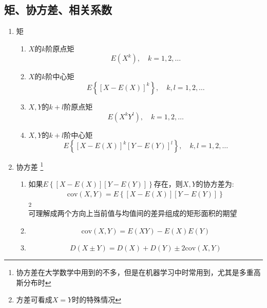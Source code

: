 \subsection{矩、协方差、相关系数}
\begin{enumerate}
	\item 矩
	\begin{enumerate}
		\item $X$的$k$阶原点矩
		\begin{equation}
			E(X^k), \quad k = 1, 2, \dots
		\end{equation}

		\item $X$的$k$阶中心矩
		\begin{equation}
			E\left\{\left[X-E(X) \right]^k\right\}, \quad k,l = 1, 2, \dots
		\end{equation}

		\item $X,Y$的$k+l$阶原点矩
		\begin{equation}
			E(X^kY^l), \quad k = 1, 2, \dots
		\end{equation}

		\item $X,Y$的$k+l$阶中心矩
		\begin{equation}
			E\left\{\left[X-E(X) \right]^k \left[Y-E(Y) \right]^l\right\}, \quad k,l = 1, 2, \dots
		\end{equation}
	\end{enumerate}
	
	\item 协方差 
	\footnote{协方差在大学数学中用到的不多，但是在机器学习中时常用到，尤其是多重高斯分布时} \\
	\begin{enumerate}
		\item 如果$E\left\{\left[X-E(X)\right]\left[Y-E(Y)\right]\right\}$存在，则$X,Y$的协方差为:
		\begin{align}
			\mathrm{cov}(X,Y) = E\left\{\left[X-E(X)\right]\left[Y-E(Y)\right]\right\}
		\end{align}
		\footnote{方差可看成$X=Y$时的特殊情况} \\
		可理解成两个方向上当前值与均值间的差异组成的矩形面积的期望
		\item 
		\begin{equation}
			\mathrm{cov}(X,Y) = E(XY) - E(X)E(Y)
		\end{equation}

		\item 
		\begin{equation}
			D(X\pm Y) = D(X) + D(Y) \pm 2\mathrm{cov}(X,Y)
		\end{equation}


\end{enumerate}
\end{enumerate}
